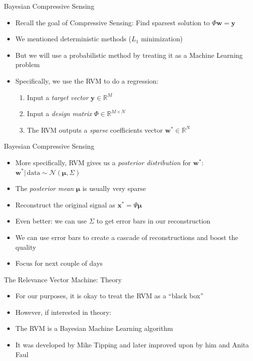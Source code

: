 \documentclass[xcolor=table]{beamer}
\numberwithin{equation}{section}
\let\bs\boldsymbol
\begin{document}
\begin{frame}{Bayesian Compressive Sensing}
\begin{itemize}%
\item Recall the goal of Compressive Sensing: Find sparsest solution to $\Phi\bs w = \bs y$ 
\item We mentioned deterministic methods ($L_1$ minimization)
\item But we will use a probabilistic method by treating it as a Machine Learning problem
\item Specifically, we use the RVM to do a regression:
\begin{enumerate}
\item Input a \emph{target vector} $\bs y \in \mathbb{R}^M$
\item Input a \emph{design matrix} $\Phi \in \mathbb{R}^{M\times N}$
\item The RVM outputs a \emph{sparse} coefficients vector $\bs w^* \in \mathbb{R}^N$
\end{enumerate}
\end{itemize}
\end{frame}

\begin{frame}{Bayesian Compressive Sensing}
\begin{itemize}
\item More specifically, RVM gives us a \emph{posterior distribution} for $\bs w^*$: $\bs w^*|\,\mbox{data} \sim \mathcal{N}(\bs\mu,\Sigma)$ 
\item The \emph{posterior mean} $\bs\mu$ is usually very sparse
\item Reconstruct the original signal as $\bs x^* = \Psi\bs\mu$
\item Even better: we can use $\Sigma$ to get error bars in our reconstruction
\item We can use error bars to create a cascade of reconstructions and boost the quality
\item Focus for next couple of days
\end{itemize}
\end{frame}


\begin{frame}{The Relevance Vector Machine: Theory}
\begin{itemize}%
\item For our purposes, it is okay to treat the RVM as a ``black box'' 
\item However, if interested in theory:
\item The RVM \cite{tipping2001} is a Bayesian Machine Learning algorithm
\item It was developed by Mike Tipping\cite{tipping2001} and later improved upon by him and Anita Faul\cite{tipping2003}
\end{itemize}
\end{frame}
\end{document}
